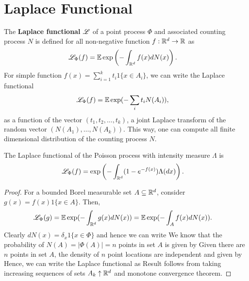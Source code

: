 \documentclass[a4paper,english,10pt]{article}
\begin{document}
\section{Laplace Functional}
The \textbf{Laplace functional} $\mathscr{L}$ of a point process $\Phi$ and associated counting process $N$ is defined for all non-negative function $f: \mathbb{R}^d \to \mathbb{R}$ as 
\begin{align*}
\mathscr{L}_{\Phi}(f) &= \mathbb{E} \exp\left(-\int_{\mathbb{R}^d}f(x)dN(x)\right).
\end{align*}
For simple function $f(x) = \sum_{i = 1}^{k}t_i1\{x \in A_i\}$, we can write the Laplace functional 
\begin{align*}
\mathscr{L}_{\Phi}(f) &= \mathbb{E}\exp(-\sum_{i}t_iN(A_i)),
\end{align*}
as a function of the vector $(t_1, t_2, \dots, t_k)$, a joint Laplace transform of the random vector $(N(A_1), \dots, N(A_k))$. 
This way, one can compute all finite dimensional distribution of the counting process $N$. 
\begin{prop}
The Laplace functional of the Poisson process with intensity measure $\Lambda$ is 
\begin{align*}
\mathscr{L}_{\Phi}(f) &= \exp\left(-\int_{\mathbb{R}^d}(1-e^{-f(x)})\Lambda(dx)\right).
\end{align*}  
\end{prop}
\begin{proof}
For a bounded Borel measurable set $A \subseteq \mathbb{R}^d$, consider $g(x) = f(x)1\{x \in A\}$. 
Then,
\begin{align*}
\mathscr{L}_{\Phi}(g) &= \mathbb{E}\exp(-\int_{\mathbb{R}^d}g(x)dN(x)) = \mathbb{E}\exp(-\int_{A}f(x)dN(x)).
\end{align*} 
Clearly $dN(x) = \delta_{x}1\{x \in \Phi\}$ and hence we can write 
We know that the probability of $N(A) = |\Phi(A)| = n$ points in set $A$ is given by 
Given there are $n$ points in set $A$, the density of $n$ point locations are independent and given by
Hence, we can write the Laplace functional as 
Result follows from taking increasing sequences of sets $A_k \uparrow \mathbb{R}^d$ and monotone convergence theorem.
\end{proof}
\end{document}
